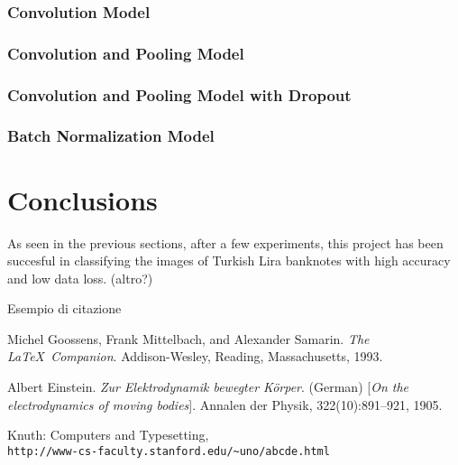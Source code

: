 \documentclass[a4paper,12pt]{article}
\begin{document}
\subsubsection{Convolution Model}


\subsubsection{Convolution and Pooling Model}


\subsubsection{Convolution and Pooling Model with Dropout}


\subsubsection{Batch Normalization Model}








\newpage
\section{Conclusions}
As seen in the previous sections, after a few experiments, this project has been succesful in classifying the images of Turkish 
Lira banknotes with high accuracy and low data loss.
(altro?)




Esempio di citazione\cite{latexcompanion}

\newpage
{}
\begin{thebibliography}{9}
Michel Goossens, Frank Mittelbach, and Alexander Samarin. 
\textit{The \LaTeX\ Companion}. 
Addison-Wesley, Reading, Massachusetts, 1993.

Albert Einstein. 
\textit{Zur Elektrodynamik bewegter K{\"o}rper}. (German) 
[\textit{On the electrodynamics of moving bodies}]. 
Annalen der Physik, 322(10):891–921, 1905.

Knuth: Computers and Typesetting,
\\\texttt{http://www-cs-faculty.stanford.edu/\~{}uno/abcde.html}
\end{thebibliography}
\end{document}
